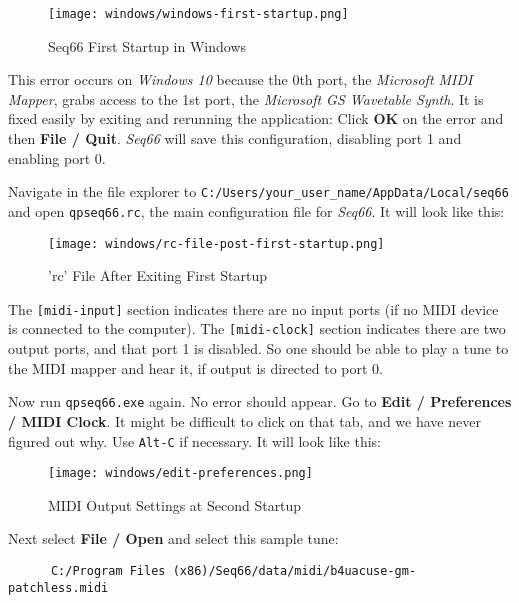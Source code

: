 \begin{figure}[H]
   \centering 
   \texttt{[image: windows/windows-first-startup.png]}
   \caption{Seq66 First Startup in Windows}
   \label{fig:windows_first_startup}
\end{figure}

   This error occurs on \textsl{Windows 10} because the 0th port, the
   \textsl{Microsoft MIDI Mapper}, grabs access to the 1st port, the
   \textsl{Microsoft GS Wavetable Synth}.  It is fixed easily by exiting
   and rerunning the application:
   Click \textbf{OK} on the error and then \textbf{File / Quit}.
   \textsl{Seq66} will save this configuration, disabling port 1 and
   enabling port 0.

   Navigate in the file explorer to
   \texttt{C:/Users/your\_user\_name/AppData/Local/seq66} and open
   \texttt{qpseq66.rc}, the main configuration file for \textsl{Seq66}.
   It will look like this:

\begin{figure}[H]
   \centering 
   \texttt{[image: windows/rc-file-post-first-startup.png]}
   \caption{'rc' File After Exiting First Startup}
   \label{fig:windows_rc_file_post_first_startup}
\end{figure}

   The \texttt{[midi-input]} section indicates there are no input ports
   (if no MIDI device is connected to the computer).
   The \texttt{[midi-clock]} section indicates there are two output
   ports, and that port 1 is disabled.   So one should be able to
   play a tune to the MIDI mapper and hear it, if output is directed
   to port 0.

   Now run \texttt{qpseq66.exe} again.  No error should appear.
   Go to \textbf{Edit / Preferences / MIDI Clock}.  It might be
   difficult to click on that tab, and we have never figured out why.
   Use \texttt{Alt-C} if necessary.
   It will look like this:

\begin{figure}[H]
   \centering 
   \texttt{[image: windows/edit-preferences.png]}
   \caption{MIDI Output Settings at Second Startup}
   \label{fig:windows_output_settings_second_startup}
\end{figure}

   Next select \textbf{File / Open} and select this sample tune:

   \begin{verbatim}
      C:/Program Files (x86)/Seq66/data/midi/b4uacuse-gm-patchless.midi
   \end{verbatim}

